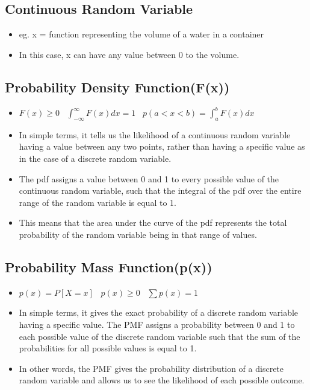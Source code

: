\documentclass[8pt]{report}
\begin{document}
		\subsection{Continuous Random Variable}
			\begin{itemize}
				\item eg. x = function representing the volume of a water in a container
				\item In this case, x can have any value between 0 to the volume.
			\end{itemize}\hrulefill
		\subsection{Probability Density Function(F(x))}
			\begin{itemize}
				\item $\boxed{F(x) \geq 0}\;\;\;\boxed{\int_{-\infty}^\infty F(x)dx= 1}\;\;\;\boxed{p(a<x<b)=\int_a^bF(x)dx}$
				\item In simple terms, it tells us the likelihood of a continuous random variable having a value between any two points, rather than having a specific value as in the case of a discrete random variable. 
				\item The pdf assigns a value between 0 and 1 to every possible value of the continuous random variable, such that the integral of the pdf over the entire range of the random variable is equal to 1. 
				\item This means that the area under the curve of the pdf represents the total probability of the random variable being in that range of values.
			\end{itemize}\hrulefill
		\subsection{Probability Mass Function(p(x))}
			\begin{itemize}
				\item $\boxed{p(x) = P[X=x]}\;\;\;\boxed{p(x)\geq 0}\;\;\;\boxed{\sum p(x)=1}$
				\item In simple terms, it gives the exact probability of a discrete random variable having a specific value. The PMF assigns a probability between 0 and 1 to each possible value of the discrete random variable such that the sum of the probabilities for all possible values is equal to 1. 
				\item In other words, the PMF gives the probability distribution of a discrete random variable and allows us to see the likelihood of each possible outcome.
			\end{itemize}\hrulefill
\end{document}
